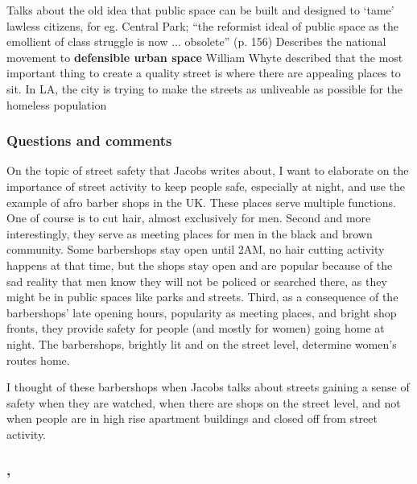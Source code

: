 \documentclass{article}
\begin{document}
\begin{outline}
	\1 Talks about the old idea that public space can be built and designed to `tame' lawless citizens, for eg. Central Park; ``the reformist ideal of public space as the emollient of class struggle is now ... obsolete'' (p. 156)
	\1 Describes the national movement to \textbf{defensible urban space}
	\1 William Whyte described that the most important thing to create a quality street is where there are appealing places to sit. In LA, the city is trying to make the streets as unliveable as possible for the homeless population
\end{outline}

\subsubsection{Questions and comments}

On the topic of street safety that Jacobs writes about, I want to elaborate on the importance of street activity to keep people safe, especially at night, and use the example of afro barber shops in the UK. 
These places serve multiple functions. One of course is to cut hair, almost exclusively for men.
Second and more interestingly, they serve as meeting places for men in the black and brown community. Some barbershops stay open until 2AM, no hair cutting activity happens at that time, but the shops stay open and are popular because of the sad reality that men know they will not be policed or searched there, as they might be in public spaces like parks and streets. 
Third, as a consequence of the barbershops' late opening hours, popularity as meeting places, and bright shop fronts, they provide safety for people (and mostly for women) going home at night. The barbershops, brightly lit and on the street level, determine women's routes home.

I thought of these barbershops when Jacobs talks about streets gaining a sense of safety when they are watched, when there are shops on the street level, and not when people are in high rise apartment buildings and closed off from street activity.



\subsubsection{, \textit{}}

\begin{outline}
	\1
\end{outline}

\fi
\end{document}
